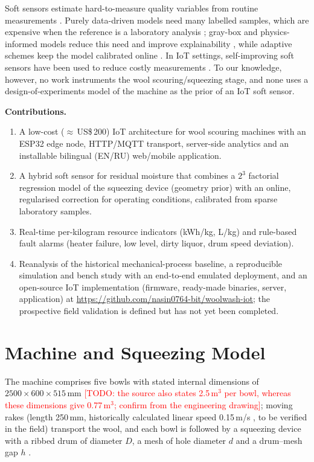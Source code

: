 \documentclass[journal]{IEEEtran}
\newcommand{\TODO}[1]{\textcolor{red}{[TODO: #1]}}
\begin{document}
Soft sensors estimate hard-to-measure quality variables from routine measurements \cite{sun2021survey}. Purely
data-driven models need many labelled samples, which are expensive when the reference is a laboratory analysis
\cite{zhang2021novel}; gray-box and physics-informed models reduce this need and improve explainability
\cite{ahmad2020gray,bikmukhametov2020combining}, while adaptive schemes keep the model calibrated online
\cite{hasnen2023semi}. In IoT settings, self-improving soft sensors have been used to reduce costly measurements
\cite{lee2026cost}. To our knowledge, however, no work instruments the wool scouring/squeezing stage, and none uses
a design-of-experiments model of the machine as the prior of an IoT soft sensor.

\textbf{Contributions.}
\begin{enumerate}
\item A low-cost ($\approx$\,US\$\,200) IoT architecture for wool scouring machines with an ESP32 edge node, HTTP/MQTT
transport, server-side analytics and an installable bilingual (EN/RU) web/mobile application.
\item A hybrid soft sensor for residual moisture that combines a $2^3$ factorial regression model of the squeezing device
(geometry prior) with an online, regularised correction for operating conditions, calibrated from sparse laboratory samples.
\item Real-time per-kilogram resource indicators (kWh/kg, L/kg) and rule-based fault alarms (heater failure, low level,
dirty liquor, drum speed deviation).
\item Reanalysis of the historical mechanical-process baseline, a reproducible simulation and bench study with an
end-to-end emulated deployment, and an
open-source IoT implementation (firmware, ready-made binaries, server, application) at
\url{https://github.com/nasin0764-bit/woolwash-iot}; the prospective field validation is defined but has not yet
been completed.
\end{enumerate}

\section{Machine and Squeezing Model}
The machine comprises five bowls with stated internal dimensions of $2500\times600\times515$\,mm
\cite{tuguzbayeva2024}\TODO{the source also states 2.5\,m$^3$ per bowl, whereas these dimensions give
0.77\,m$^3$; confirm from the engineering drawing}; moving rakes (length 250\,mm, historically calculated linear
speed 0.15\,m/s \cite{tuguzbayeva2024}, to be verified in the field) transport the wool, and each bowl is followed by a squeezing device with a ribbed drum of diameter $D$, a mesh of hole diameter
$d$ and a drum--mesh gap $h$ \cite{tuguzbayeva2024}.
\end{document}
